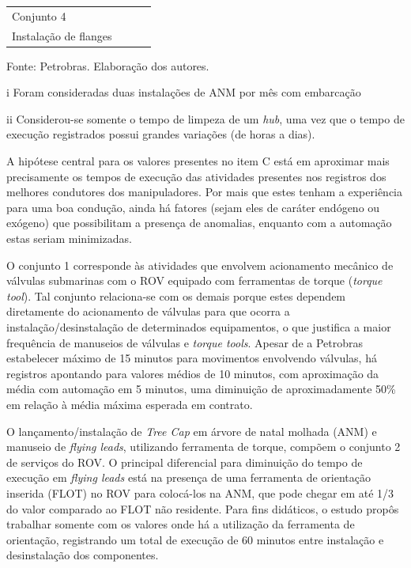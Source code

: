 \begin{table}[h]
{\begin{threeparttable}
\begin{tabular}{l >{\centering\arraybackslash}m{3.0cm} >{\centering\arraybackslash}m{3.0cm} >{\centering\arraybackslash}m{3.0cm}}
		Conjunto 4                                     &                                  &                                &                              \\
		\hspace{3mm}Instalação de flanges              & 5                                & 180                            & 60                           \\ \hline
	\end{tabular}
	\begin{tablenotes}
		\item Fonte: Petrobras. Elaboração dos autores.
        \item[i]{Foram consideradas duas instalações de ANM por mês com embarcação}
        \item[ii]{Considerou-se somente o tempo de limpeza de um \textit{hub}, uma vez que o tempo de execução registrados possui grandes variações (de horas a dias).}
    \end{tablenotes}
    \end{threeparttable}
    }
\end{table}

A hipótese central para os valores presentes no item C está em aproximar mais precisamente os tempos de execução das atividades presentes nos registros dos melhores condutores dos manipuladores. Por mais que estes tenham a experiência para uma boa condução, ainda há fatores (sejam eles de caráter endógeno ou exógeno) que possibilitam a presença de anomalias, enquanto com a automação estas seriam minimizadas.

O conjunto 1 corresponde às atividades que envolvem acionamento mecânico de válvulas submarinas com o ROV equipado com ferramentas de torque (\textit{torque tool}). Tal conjunto relaciona-se com os demais porque estes dependem diretamente do acionamento de válvulas para que ocorra a instalação/desinstalação de determinados equipamentos, o que justifica a maior frequência de manuseios de válvulas e \textit{torque tools}. Apesar de a Petrobras estabelecer máximo de 15 minutos para movimentos envolvendo válvulas, há registros apontando para valores médios de 10 minutos, com aproximação da média com automação em 5 minutos, uma diminuição de aproximadamente 50\% em relação à média máxima esperada em contrato.

O lançamento/instalação de \textit{Tree Cap} em árvore de natal molhada (ANM) e manuseio de \textit{flying leads}, utilizando ferramenta de torque, compõem o conjunto 2 de serviços do ROV. O principal diferencial para diminuição do tempo de execução em \textit{flying leads} está na presença de uma ferramenta de orientação inserida (FLOT) no ROV para colocá-los na ANM, que pode chegar em até 1/3 do valor comparado ao FLOT não residente. Para fins didáticos, o estudo propôs trabalhar somente com os valores onde há a utilização da ferramenta de orientação, registrando um total de execução de 60 minutos entre instalação e desinstalação dos componentes.

